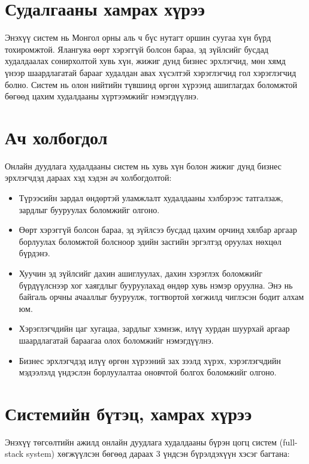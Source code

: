 \section{Судалгааны хамрах хүрээ}
Энэхүү систем нь Монгол орны аль ч бүс нутагт оршин суугаа хүн бүрд тохиромжтой. Ялангуяа өөрт хэрэггүй болсон бараа, эд зүйлсийг бусдад худалдаалах сонирхолтой хувь хүн, жижиг дунд бизнес эрхлэгчид, мөн хямд үнээр шаардлагатай барааг худалдан авах хүсэлтэй хэрэглэгчид гол хэрэглэгчид болно. Систем нь олон нийтийн түвшинд өргөн хүрээнд ашиглагдах боломжтой бөгөөд цахим худалдааны хүртээмжийг нэмэгдүүлнэ.

\section{Ач холбогдол}
Онлайн дуудлага худалдааны систем нь хувь хүн болон жижиг дунд бизнес эрхлэгчдэд дараах хэд хэдэн ач холбогдолтой:

\begin{itemize}
\item Түрээсийн зардал өндөртэй уламжлалт худалдааны хэлбэрээс татгалзаж, зардлыг бууруулах боломжийг олгоно.
\item Өөрт хэрэггүй болсон бараа, эд зүйлсээ бусдад цахим орчинд хялбар аргаар борлуулах боломжтой болсноор эдийн засгийн эргэлтэд оруулах нөхцөл бүрдэнэ.
\item Хуучин эд зүйлсийг дахин ашиглуулах, дахин хэрэглэх боломжийг бүрдүүлснээр хог хаягдлыг бууруулахад өндөр хувь нэмэр оруулна. Энэ нь байгаль орчны ачааллыг бууруулж, тогтвортой хөгжилд чиглэсэн бодит алхам юм.
\item Хэрэглэгчдийн цаг хугацаа, зардлыг хэмнэж, илүү хурдан шуурхай аргаар шаардлагатай бараагаа олох боломжийг нэмэгдүүлнэ.
\item Бизнес эрхлэгчдэд илүү өргөн хүрээний зах зээлд хүрэх, хэрэглэгчдийн мэдээлэлд үндэслэн борлуулалтаа оновчтой болгох боломжийг олгоно.
\end{itemize}
\section{Системийн бүтэц, хамрах хүрээ}
Энэхүү төгсөлтийн ажилд онлайн дуудлага худалдааны бүрэн цогц систем (full-stack system) хөгжүүлсэн бөгөөд дараах 3 үндсэн бүрэлдэхүүн хэсэг багтана:

